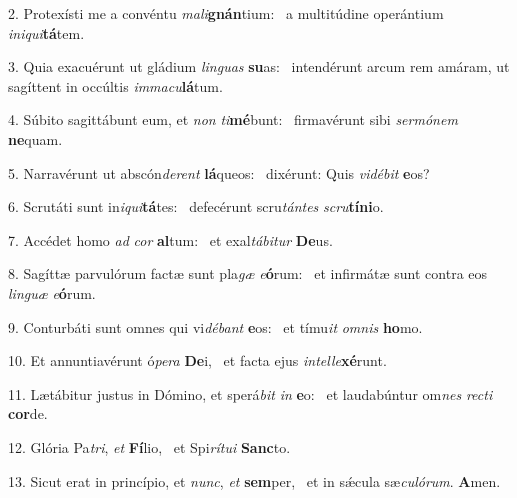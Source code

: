 2. Protexísti me a convéntu \textit{ma}\textit{li}\textbf{gnán}tium: \ast\  a multitúdine operántium \textit{in}\textit{i}\textit{qui}\textbf{tá}tem.\

3. Quia exacuérunt ut gládium \textit{lin}\textit{guas} \textbf{su}as: \ast\  intendérunt arcum rem amáram, ut sagíttent in occúltis \textit{im}\textit{ma}\textit{cu}\textbf{lá}tum.\

4. Súbito sagittábunt eum, et \textit{non} \textit{ti}\textbf{mé}bunt: \ast\  firmavérunt sibi \textit{ser}\textit{mó}\textit{nem} \textbf{ne}quam.\

5. Narravérunt ut abscón\textit{de}\textit{rent} \textbf{lá}queos: \ast\  dixérunt: Quis \textit{vi}\textit{dé}\textit{bit} \textbf{e}os?\

6. Scrutáti sunt in\textit{i}\textit{qui}\textbf{tá}tes: \ast\  defecérunt scru\textit{tán}\textit{tes} \textit{scru}\textbf{tí}\textbf{ni}o.\

7. Accédet homo \textit{ad} \textit{cor} \textbf{al}tum: \ast\  et exal\textit{tá}\textit{bi}\textit{tur} \textbf{De}us.\

8. Sagíttæ parvulórum factæ sunt pla\textit{gæ} \textit{e}\textbf{ó}rum: \ast\  et infirmátæ sunt contra eos \textit{lin}\textit{guæ} \textit{e}\textbf{ó}rum.\

9. Conturbáti sunt omnes qui vi\textit{dé}\textit{bant} \textbf{e}os: \ast\  et tímu\textit{it} \textit{om}\textit{nis} \textbf{ho}mo.\

10. Et annuntiavérunt ó\textit{pe}\textit{ra} \textbf{De}i, \ast\  et facta ejus \textit{in}\textit{tel}\textit{le}\textbf{xé}runt.\

11. Lætábitur justus in Dómino, et sperá\textit{bit} \textit{in} \textbf{e}o: \ast\  et laudabúntur om\textit{nes} \textit{rec}\textit{ti} \textbf{cor}de.\

12. Glória Pa\textit{tri}, \textit{et} \textbf{Fí}lio, \ast\  et Spi\textit{rí}\textit{tu}\textit{i} \textbf{Sanc}to.\

13. Sicut erat in princípio, et \textit{nunc}, \textit{et} \textbf{sem}per, \ast\  et in sǽcula sæ\textit{cu}\textit{ló}\textit{rum}. \textbf{A}men.\

